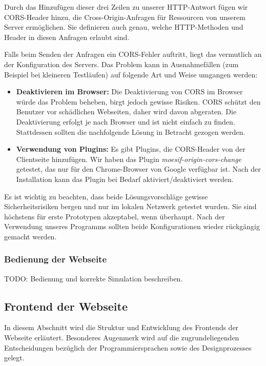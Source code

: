 Durch das Hinzufügen dieser drei Zeilen zu unserer HTTP-Antwort fügen wir CORS-Header hinzu, die Cross-Origin-Anfragen für Ressourcen von unserem Server ermöglichen. Sie definieren auch genau, welche HTTP-Methoden und Header in diesen Anfragen erlaubt sind.

Falls beim Senden der Anfragen ein CORS-Fehler auftritt, liegt das vermutlich an der Konfiguration des Servers. Das Problem kann in Ausnahmefällen (zum Beispiel bei kleineren Testläufen) auf folgende Art und Weise umgangen werden:

\begin{itemize}
\item \textbf{Deaktivieren im Browser:} Die Deaktivierung von CORS im Browser würde das Problem beheben, birgt jedoch gewisse Risiken. CORS schützt den Benutzer vor schädlichen Webseiten, daher wird davon abgeraten. Die Deaktivierung erfolgt je nach Browser und ist nicht einfach zu finden. Stattdessen sollten die nachfolgende Lösung in Betracht gezogen werden.
\item \textbf{Verwendung von Plugins:} Es gibt Plugins, die CORS-Header von der Clientseite hinzufügen. Wir haben das Plugin \textit{moesif-origin-cors-change} getestet, das nur für den Chrome-Browser von Google verfügbar ist. Nach der Installation kann das Plugin bei Bedarf aktiviert/deaktiviert werden.
\end{itemize}

Es ist wichtig zu beachten, dass beide Lösungsvorschläge gewisse Sicherheitsrisiken bergen und nur im lokalen Netzwerk getestet wurden. Sie sind höchstens für erste Prototypen akzeptabel, wenn überhaupt. Nach der Verwendung unseres Programms sollten beide Konfigurationen wieder rückgängig gemacht werden.

\subsubsection{Bedienung der Webseite}
TODO: Bedienung und korrekte Simulation beschreiben.

\subsection{Frontend der Webseite} 
In diesem Abschnitt wird die Struktur und Entwicklung des Frontends der Webseite erläutert. Besonderes Augenmerk wird
auf die zugrundeliegenden Entscheidungen bezüglich der Programmiersprachen sowie des Designprozesses gelegt.

